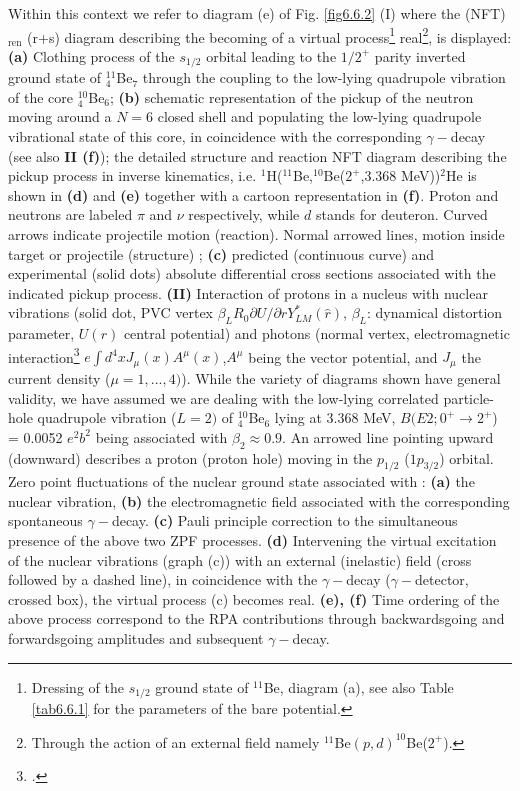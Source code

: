 Within this context we refer to diagram (e) of Fig. \ref{fig6.6.2} (I) where the (NFT)$_{\text{ren}}$ (r+s) diagram describing the becoming of a virtual process\footnote{Dressing of the $s_{1/2}$ ground state of $^{11}$Be, diagram (a), see also Table \ref{tab6.6.1} for the parameters of the bare potential.} real\footnote{Through the action of an external field namely $^{11}$Be$(p,d)^{10}$Be($2^+$).},  is displayed:  
{\bf (a)}  Clothing process of the $s_{1/2}$ orbital leading to the $1/2^+$ parity inverted ground state of $^{11}_4$Be$_{7}$
through the coupling to the low-lying quadrupole vibration of the core $^{10}_4$Be$_6$; 
{\bf (b)} schematic representation 
of the pickup of the neutron moving around a $N=6$ closed shell and populating the low-lying
quadrupole vibrational state of this core, in coincidence with the corresponding $\gamma-$decay 
(see also {\bf II (f)}); the detailed structure and reaction NFT diagram describing the pickup
process in inverse kinematics, i.e. $^1$H($^{11}$Be,$^{10}$Be($2^+$,3.368 MeV))$^2$He is 
shown in {\bf (d)} and  {\bf (e)} together with a cartoon representation in {\bf (f)}.
Proton 
and neutrons are labeled $\pi$ and $\nu$ respectively, while $d$ stands for deuteron.
Curved arrows indicate projectile motion (reaction). Normal arrowed 
lines, motion inside target or projectile (structure)
; {\bf (c)} predicted (continuous curve) and experimental
(solid dots) absolute differential cross sections     associated with the indicated  pickup process. 
{\bf (II)} Interaction of protons in a nucleus with nuclear vibrations (solid dot, PVC vertex 
$\beta_L R_0  \partial U/\partial r Y_{LM}^*(\hat r)$, $\beta_L$: dynamical
distortion parameter, $U(r)$ central potential) and photons (normal vertex, 
electromagnetic 
interaction\footnote{\cite{Holstein:89}.} $e \int d^4 x J_{\mu}(x) A^{\mu} (x)$,$A^{\mu}$ being 
the vector potential, and $J_{\mu}$ the current density ($\mu=1,...,4)$).
While the variety of diagrams shown have general validity, we have assumed
 we are dealing with the low-lying correlated particle-hole quadrupole vibration 
($L=2)$ of $^{10}_4$Be$_6$ lying at 3.368 MeV,  $B(E2; 0^+ \to 2^+$) = 0.0052 $e^2 b^2$ being
associated with $\beta_2 \approx 0.9$. An arrowed line pointing  upward (downward) 
describes a proton (proton hole) moving in the $p_{1/2}$ ($1p_{3/2}$) orbital. 
Zero point fluctuations of the nuclear ground state associated with : {\bf (a)} the nuclear
vibration, {\bf (b)} the electromagnetic field associated with the corresponding spontaneous
$\gamma-$decay.   {\bf (c)} Pauli principle correction to the simultaneous presence 
of the above two ZPF processes. {\bf (d)} Intervening the virtual excitation of the nuclear vibrations 
(graph (c)) with an external (inelastic) field  (cross followed by a dashed line), in coincidence with the $\gamma-$decay 
($\gamma-$detector, crossed box), the virtual process (c) becomes real. {\bf (e), (f)}  Time ordering of the 
above process correspond to the  RPA contributions through backwardsgoing and forwardsgoing amplitudes
and subsequent $\gamma-$decay.




